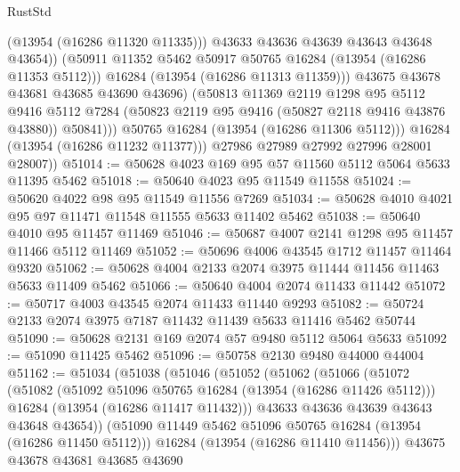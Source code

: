 \begin{lexlean}{RustStd}
\begin{coremodule}
                          (@13954 (@16286 @11320 @11335)))
                        @43633
                        @43636
                        @43639
                        @43643
                        @43648
                        @43654))
                    (@50911 @11352 @5462 @50917 @50765 @16284 (@13954 (@16286 @11353 @5112)))
                    @16284
                    (@13954 (@16286 @11313 @11359)))
                  @43675
                  @43678
                  @43681
                  @43685
                  @43690
                  @43696)
                (@50813
                  @11369
                  @2119
                  @1298
                  @95
                  @5112
                  @9416
                  @5112
                  @7284
                  (@50823 @2119 @95 @9416 (@50827 @2118 @9416 @43876 @43880))
                  @50841)))
            @50765
            @16284
            (@13954 (@16286 @11306 @5112)))
          @16284
          (@13954 (@16286 @11232 @11377)))
        @27986
        @27989
        @27992
        @27996
        @28001
        @28007))
@51014 := @50628 @4023 @169 @95 @57 @11560 @5112 @5064 @5633 @11395 @5462
@51018 := @50640 @4023 @95 @11549 @11558
@51024 := @50620 @4022 @98 @95 @11549 @11556 @7269
@51034 := @50628 @4010 @4021 @95 @97 @11471 @11548 @11555 @5633 @11402 @5462
@51038 := @50640 @4010 @95 @11457 @11469
@51046 := @50687 @4007 @2141 @1298 @95 @11457 @11466 @5112 @11469
@51052 := @50696 @4006 @43545 @1712 @11457 @11464 @9320
@51062 := @50628 @4004 @2133 @2074 @3975 @11444 @11456 @11463 @5633 @11409 @5462
@51066 := @50640 @4004 @2074 @11433 @11442
@51072 := @50717 @4003 @43545 @2074 @11433 @11440 @9293
@51082 := @50724 @2133 @2074 @3975 @7187 @11432 @11439 @5633 @11416 @5462 @50744
@51090 := @50628 @2131 @169 @2074 @57 @9480 @5112 @5064 @5633
@51092 := @51090 @11425 @5462
@51096 := @50758 @2130 @9480 @44000 @44004
@51162 := @51034
    (@51038
      (@51046
        (@51052
          (@51062
            (@51066
              (@51072
                (@51082
                  (@51092 @51096 @50765 @16284 (@13954 (@16286 @11426 @5112)))
                  @16284
                  (@13954 (@16286 @11417 @11432)))
                @43633
                @43636
                @43639
                @43643
                @43648
                @43654))
            (@51090 @11449 @5462 @51096 @50765 @16284 (@13954 (@16286 @11450 @5112)))
            @16284
            (@13954 (@16286 @11410 @11456)))
          @43675
          @43678
          @43681
          @43685
          @43690

\end{coremodule}
\end{lexlean}
